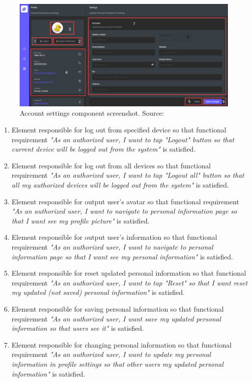 \begin{figure}[H]
    \centering
    \includegraphics[width=1\textwidth]{Pictures/11_Messenger_account_settings}
    \caption{Account settings component screenshot. Source: }\label{fig:figure11}
\end{figure}
\begin{enumerate}
    \item Element responsible for log out from specified device so that functional requirement
    \textit{"As an authorized user, I want to tap "Logout" button so that current device
    will be logged out from the system"} is satisfied.
    \item Element responsible for log out from all devices so that functional requirement
    \textit{"As an authorized user, I want to tap "Logout all" button so that all my authorized devices will be
    logged out from the system"} is satisfied.
    \item Element responsible for output user's avatar so that functional requirement
    \textit{"As an authorized user, I want to navigate to personal information page so that
    I want see my profile picture"} is satisfied.
    \item Element responsible for output user's information so that functional requirement
    \textit{"As an authorized user, I want to navigate to personal information page so that I want see my
    personal information"} is satisfied.
    \item Element responsible for reset updated personal information so that functional requirement
    \textit{"As an authorized user, I want to tap "Reset" so that I want reset my updated (not saved)
        personal information"} is satisfied.
    \item Element responsible for saving personal information so that functional requirement
    \textit{"As an authorized user, I want save my updated personal information so that users see it"}
    is satisfied.
    \item Element responsible for changing personal information so that functional requirement
    \textit{"As an authorized user, I want to update my personal information in profile settings so that other users
    my updated personal information"} is satisfied.
\end{enumerate}

